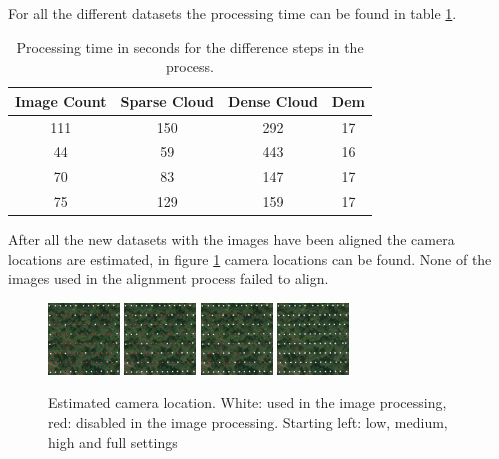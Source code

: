 \documentclass{isprs} %
\begin{document}
For all the different datasets the processing time can be found in table \ref{tab:processingTime}.  

\begin{table}[h]
    \centering
    \caption{Processing time in seconds for the difference steps in the process.}
    \label{tab:processingTime}
    \begin{tabular}{@{}cccc@{}}
    \toprule
    \textbf{Image Count} & \textbf{Sparse  Cloud} & \textbf{Dense Cloud} & \textbf{Dem} \\ \midrule
    111                  & 150                    & 292                  & 17           \\
    44                   & 59                     & 443                  & 16           \\
    70                   & 83                     & 147                  & 17           \\
    75                   & 129                    & 159                  & 17           \\ \bottomrule
    \end{tabular}
\end{table}

After all the new datasets with the images have been aligned the camera locations are estimated, in figure \ref{fig:cameralocation} camera locations can be found. 
None of the images used in the alignment process failed to align.


\begin{figure}[h]
    \centering
    \includegraphics[width=1.9cm]{loc_low.png}
    \includegraphics[width=1.9cm]{loc_med.png}
    \includegraphics[width=1.9cm]{loc_high.png}
    \includegraphics[width=1.9cm]{loc_full.png}
    \caption{Estimated camera location. 
    White: used in the image processing, red: disabled in the image processing.
    Starting left: low, medium, high and full settings}
    \label{fig:cameralocation}
\end{figure}
\end{document}
